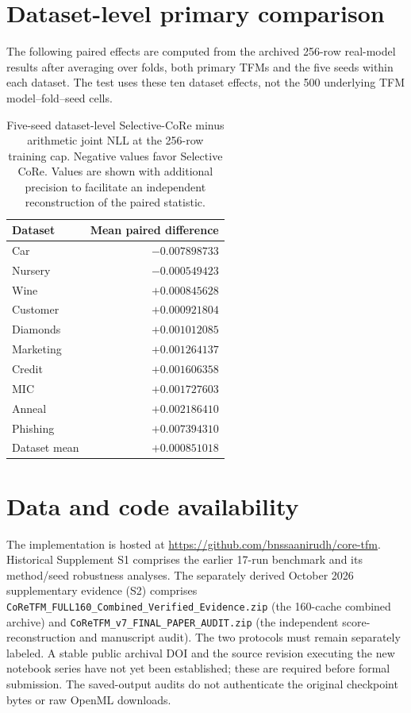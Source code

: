 \documentclass[a4paper,fleqn]{cas-sc}
\begin{document}
\section{Dataset-level primary comparison}
The following paired effects are computed from the archived 256-row real-model results after averaging over folds, both primary TFMs and the five seeds within each dataset. The test uses these ten dataset effects, not the 500 underlying TFM model--fold--seed cells.
\begin{table}
\centering
\caption{Five-seed dataset-level Selective-CoRe minus arithmetic joint NLL at the 256-row training cap. Negative values favor Selective CoRe. Values are shown with additional precision to facilitate an independent reconstruction of the paired statistic.}
\label{tab:datasetprimary}
\begin{tabular}{lr}
\toprule
Dataset & Mean paired difference\\
\midrule
Car & $-0.007898733$\\
Nursery & $-0.000549423$\\
Wine & $+0.000845628$\\
Customer & $+0.000921804$\\
Diamonds & $+0.001012085$\\
Marketing & $+0.001264137$\\
Credit & $+0.001606358$\\
MIC & $+0.001727603$\\
Anneal & $+0.002186410$\\
Phishing & $+0.007394310$\\
\midrule
Dataset mean & $+0.000851018$\\
\bottomrule
\end{tabular}
\end{table}

\section*{Data and code availability}
The implementation is hosted at \url{https://github.com/bnssaanirudh/core-tfm}. Historical Supplement S1 comprises the earlier 17-run benchmark and its method/seed robustness analyses. The separately derived October 2026 supplementary evidence (S2) comprises \texttt{CoReTFM\_FULL160\_Combined\_Verified\_Evidence.zip} (the 160-cache combined archive) and \texttt{CoReTFM\_v7\_FINAL\_PAPER\_AUDIT.zip} (the independent score-reconstruction and manuscript audit). The two protocols must remain separately labeled. A stable public archival DOI and the source revision executing the new notebook series have not yet been established; these are required before formal submission. The saved-output audits do not authenticate the original checkpoint bytes or raw OpenML downloads.
\end{document}
